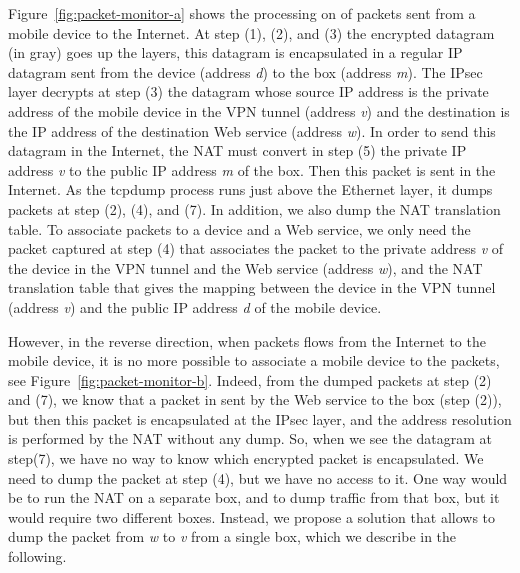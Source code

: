 Figure~\ref{fig:packet-monitor-a} shows the processing on \platname{}
of packets sent from a mobile device to the Internet. At step (1),
(2), and (3) the encrypted datagram (in gray) goes up the layers, this
datagram is encapsulated in a regular IP datagram sent from the device
(address \emph{d}) to the \platname{} box (address \emph{m}). The
IPsec layer decrypts at step (3) the datagram whose source IP address
is the private address of the mobile device in the VPN tunnel (address
\emph{v}) and the destination is the IP address of the destination
Web service (address \emph{w}). In order to send this datagram in the
Internet, the NAT must convert in step (5) the private IP address
\emph{v} to the public IP address \emph{m} of the \platname{}
box. Then this packet is sent in the Internet. As the tcpdump process
runs just above the Ethernet layer, it dumps packets at step (2), (4),
and (7). In addition, we also dump the NAT translation
table. To associate packets to a device and a Web service,
we only need the packet captured at step (4) that associates the
packet to the private address \emph{v} of the device in the VPN tunnel
and the Web service (address \emph{w}), and the NAT translation table
that gives the mapping between the device in the VPN tunnel (address
\emph{v}) and the public IP address \emph{d} of the mobile device.

However, in the reverse direction, when packets flows from the
Internet to the mobile device, it is no more possible to associate a
mobile device to the packets, see
Figure~\ref{fig:packet-monitor-b}. Indeed, from the dumped packets at
step (2) and (7), we know that a packet in sent by the Web service to
the \platname{} box (step (2)), but then this packet is encapsulated
at the IPsec layer, and the address resolution is performed by the NAT
without any dump. So, when we see the datagram at step(7), we have no
way to know which encrypted packet is encapsulated. We need to dump
the packet at step (4), but we have no access to it. One way would be
to run the NAT on a separate box, and to dump traffic from that box,
but it would require two different boxes. Instead, we propose a
solution that allows to dump the packet from \emph{w} to \emph{v} from
a single box, which we describe in the following. 

